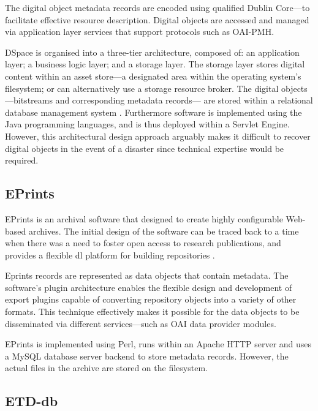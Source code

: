 The digital object metadata records are encoded using qualified Dublin Core---to facilitate effective resource description. Digital objects are accessed and managed via application layer services that support protocols such as OAI-PMH.

DSpace is organised into a three-tier architecture, composed of: an application layer; a business logic layer; and a storage layer. The storage layer stores digital content within an asset store---a designated area within the operating system's filesystem; or can alternatively use a storage resource broker. The digital objects ---bitstreams and corresponding metadata records--- are stored within a relational database management system \citep{Smith2003,Tansley2003a}. Furthermore software is implemented using the Java programming languages, and is thus deployed within a Servlet Engine. However, this architectural design approach arguably makes it difficult to recover digital objects in the event of a disaster since technical expertise would be required.

\subsection{EPrints}

EPrints is an archival software that designed to create highly configurable Web-based archives. The initial design of the software can be traced back to a time when there was a need to foster open access to research publications, and provides a flexible \gls{dl} platform for building repositories \citep{Gutteridge2002}.

Eprints records are represented as data objects that contain metadata. The software's plugin architecture enables the flexible design and development of export plugins capable of converting repository objects into a variety of other formats. This technique effectively makes it possible for the data objects to be disseminated via different services---such as OAI data provider modules.

EPrints is implemented using Perl, runs within an Apache HTTP server and uses a MySQL database server backend to store metadata records. However, the actual files in the archive are stored on the filesystem.

\subsection{ETD-db}

